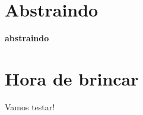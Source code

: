\documentclass[14pt]{beamer}
\begin{document}
	\section{Abstraindo}
	\begin{frame}
		\begin{center}\Huge
			\textbf{{\color{slideBlue}a}{\color{slideCyan}b}{\color{slideTurquoise}s}{\color{slideGreen}t}{\color{slideYellow}r}{\color{slideOrange}a}{\color{slideRed}i}{\color{slidePurple}n}{\color{slideBlue}d}{\color{slideCyan}o}}
		\end{center}
	\end{frame}

	\section{Hora de brincar}
		\begin{frame}
			\begin{center}\Huge
				Vamos testar!
			\end{center}
		\end{frame}

	
\end{document}
